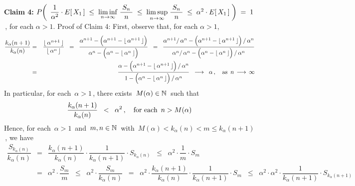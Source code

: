 \begin{enumerate}
\vskip 0.8cm
\noindent
\textbf{Claim 4:}\quad\quad
$P\!\left(\;\,
	\dfrac{1}{\alpha^{2}} \cdot E[\,X_{1}\,]
	\;\leq\;
		\underset{n\rightarrow\infty}{\liminf}\;
		\dfrac{{\color{white}.}S_{n}{\color{white}.}}{n}
	\;\leq\;
		\underset{n\rightarrow\infty}{\limsup}\;
		\dfrac{{\color{white}.}S_{n}{\color{white}.}}{n}
	\;\leq\;
		\alpha^{2} \cdot E[\,X_{1}\,]
	\;\right)
\;=\;1$\,, for each $\alpha > 1$.
\vskip 0.3cm
\noindent
Proof of Claim 4:\quad
First, observe that, for each $\alpha > 1$,
\begin{eqnarray*}
\dfrac{k_{\alpha}(n+1)}{k_{\alpha}(n)}
& = &
	\dfrac{\lfloor\, \alpha^{n+1} \,\rfloor}{\lfloor\, \alpha^{n} \,\rfloor}
\;\; = \;\;
	\dfrac{
		\alpha^{n+1} - \left(\alpha^{n+1} \overset{{\color{white}.}}{-} \lfloor\, \alpha^{n+1} \,\rfloor\right)
	}{
		\alpha^{n} - \left(\alpha^{n} \overset{{\color{white}.}}{-} \lfloor\, \alpha^{n} \,\rfloor\right)
	}
\;\; = \;\;
	\dfrac{
		\alpha^{n+1}/\,\alpha^{n} - \left(\alpha^{n+1} \overset{{\color{white}.}}{-} \lfloor\, \alpha^{n+1} \,\rfloor\right)/\,\alpha^{n}
	}{
		\alpha^{n}/\,\alpha^{n} - \left(\alpha^{n} \overset{{\color{white}.}}{-} \lfloor\, \alpha^{n} \,\rfloor\right)/\,\alpha^{n}
	}
\\
& = &
	\dfrac{
		\alpha - \left(\alpha^{n+1} \overset{{\color{white}.}}{-} \lfloor\, \alpha^{n+1} \,\rfloor\right)/\,\alpha^{n}
	}{
		1 - \left(\alpha^{n} \overset{{\color{white}.}}{-} \lfloor\, \alpha^{n} \,\rfloor\right)/\,\alpha^{n}
	}
	\;\; \longrightarrow \;\; \alpha\,,
	\quad
	\textnormal{as \,$n \,\longrightarrow\, \infty$}
\end{eqnarray*}
In particular, for each \,$\alpha > 1$\,, there exists \,$M(\alpha) \in \mathbb{N}$\, such that
\begin{equation*}
\dfrac{k_{\alpha}(n+1)}{k_{\alpha}(n)}
\;\; < \;\;
	\alpha^{2}\,,
\quad
\textnormal{for each \,$n > M(\alpha)$}
\end{equation*}
Hence, for each \,$\alpha > 1$\, and \,$m, n \in\mathbb{N}$\,
with \,$M(\alpha) < k_{\alpha}(n) < m \leq k_{\alpha}(n+1)$\,, we have
\begin{eqnarray*}
\dfrac{S_{k_{\alpha}(n)}}{k_{\alpha}(n)}
& = &
	\dfrac{k_{\alpha}(n+1)}{k_{\alpha}(n)} \cdot \dfrac{1}{k_{\alpha}(n+1)} \cdot S_{k_{\alpha}(n)}
	\;\; \leq \;\;
		\alpha^{2}\cdot\dfrac{1}{m} \cdot S_{m}
\\
& = &
	\alpha^{2}\cdot\dfrac{S_{m}}{m}
	\;\; \leq \;\;
		\alpha^{2}\cdot\dfrac{S_{m}}{k_{\alpha}(n)}
	\;\; = \;\;
		\alpha^{2} \cdot \dfrac{k_{\alpha}(n+1)}{k_{\alpha}(n)} \cdot \dfrac{1}{k_{\alpha}(n+1)} \cdot S_{m}
	\;\; \leq \;\;
		\alpha^{2} \cdot \alpha^{2} \cdot \dfrac{1}{k_{\alpha}(n+1)} \cdot S_{k_{\alpha}(n+1)}

\end{eqnarray*}
\end{enumerate}
